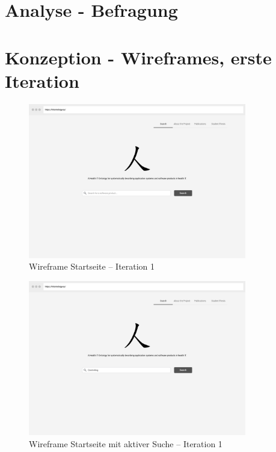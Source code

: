 \chapter{Analyse - Befragung}\label{analyse_umfrage}



\chapter{Konzeption - Wireframes, erste Iteration}\label{app_wireframes}

\begin{figure}
	\centering
    	\includegraphics[width=0.85\textwidth]{Images/Desktop_1}
   	\caption{Wireframe Startseite -- Iteration 1}
\end{figure}

\clearpage

\begin{figure}
	\centering
    	\includegraphics[width=0.85\textwidth]{Images/Desktop_2}
   	\caption{Wireframe Startseite mit aktiver Suche -- Iteration 1}
\end{figure}


